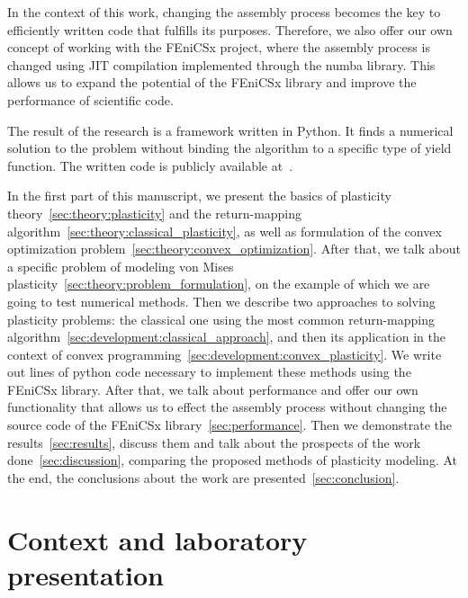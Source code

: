 \documentclass[12pt]{article}
\begin{document}
In the context of this work, changing the assembly process becomes the key to efficiently written code that fulfills its purposes. Therefore, we also offer our own concept of working with the FEniCSx project, where the assembly process is changed using JIT compilation implemented through the numba library. This allows us to expand the potential of the FEniCSx library and improve the performance of scientific code.

The result of the research is a framework written in Python. It finds a numerical solution to the problem without binding the algorithm to a specific type of yield function. The written code is publicly available at~\parencite{convex-plasticity}. 

In the first part of this manuscript, we present the basics of plasticity theory~\eqref{sec:theory:plasticity} and the return-mapping algorithm~\eqref{sec:theory:classical_plasticity}, as well as formulation of the convex optimization problem~\eqref{sec:theory:convex_optimization}. After that, we talk about a specific problem of modeling von Mises plasticity~\eqref{sec:theory:problem_formulation}, on the example of which we are going to test numerical methods. Then we describe two approaches to solving plasticity problems: the classical one using the most common return-mapping algorithm~\eqref{sec:development:classical_approach}, and then its application in the context of convex programming~\eqref{sec:development:convex_plasticity}. We write out lines of python code necessary to implement these methods using the FEniCSx library. After that, we talk about performance and offer our own functionality that allows us to effect the assembly process without changing the source code of the FEniCSx library~\eqref{sec:performance}. Then we demonstrate the results~\eqref{sec:results}, discuss them and talk about the prospects of the work done~\eqref{sec:discussion}, comparing the proposed methods of plasticity modeling. At the end, the conclusions about the work are presented~\eqref{sec:conclusion}.

\newpage
\section{Context and laboratory presentation}
\end{document}
